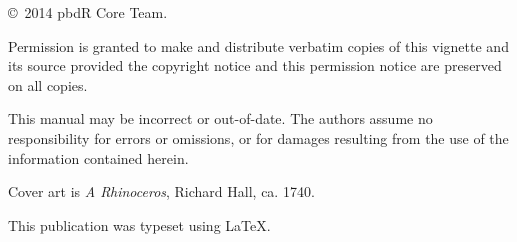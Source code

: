 \null
\vfill
\copyright\ 2014 pbdR Core Team.

Permission is granted to make and distribute verbatim copies of
this vignette and its source provided the copyright notice and
this permission notice are preserved on all copies.

This manual may be incorrect or out-of-date.  The authors assume
no responsibility for errors or omissions, or for damages resulting
from the use of the information contained herein.

Cover art is \textit{A Rhinoceros}, Richard Hall, ca. 1740.

This publication was typeset using \LaTeX.
